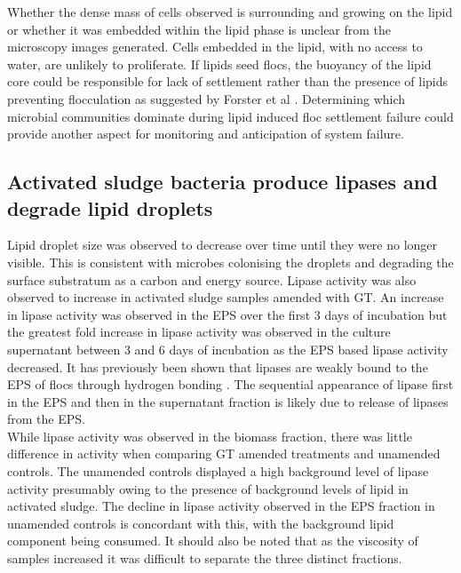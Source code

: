 \documentclass[11pt]{article}
\begin{document}
Whether the dense mass of cells observed is surrounding and growing on the lipid or whether it was embedded within the lipid phase is unclear from the microscopy images generated. Cells embedded in the lipid, with no access to water, are unlikely to proliferate. If lipids seed flocs, the buoyancy of the lipid core could be responsible for lack of settlement rather than the presence of lipids preventing flocculation as suggested by Forster et al \cite{Forster_92}. Determining which microbial communities dominate during lipid induced floc settlement failure could provide another aspect for monitoring and anticipation of system failure.

\subsection{Activated sludge bacteria produce lipases and degrade lipid droplets}

Lipid droplet size was observed to decrease over time until they were no longer visible. This is consistent with microbes colonising the droplets and degrading the surface substratum as a carbon and energy source. Lipase activity was also observed to increase in activated sludge samples amended with GT. An increase in lipase activity was observed in the EPS over the first 3 days of incubation but the greatest fold increase in lipase activity was observed in the culture supernatant between 3 and 6 days of incubation as the EPS based lipase activity decreased. It has previously been shown that lipases are weakly bound to the EPS of flocs through hydrogen bonding \cite{mayer1999role,wicker1987}. The sequential appearance of lipase first in the EPS and then in the supernatant fraction is likely due to release of lipases from the EPS.\\

While lipase activity was observed in the biomass fraction, there was little difference in activity when comparing GT amended treatments and unamended controls. The unamended controls displayed a high background level of lipase activity presumably owing to the presence of background levels of lipid in activated sludge. The decline in lipase activity observed in the EPS fraction in unamended controls is concordant with this, with the background lipid component being consumed. It should also be noted that as the viscosity of samples increased it was difficult to separate the three distinct fractions.
\end{document}
